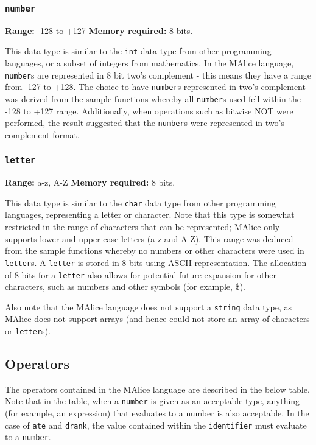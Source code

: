 \documentclass[a4wide, 10pt]{article}
\newcommand{\tab}{\hspace*{2em}}
\begin{document}
\subsubsection{\texttt{number}}
\label{sec:number}
{\bf Range:} -128 to +127 {\bf Memory required:} 8 bits.
 
\tab This data type is similar to the \texttt{int} data type from other 
programming languages, or a subset of integers from mathematics. In the MAlice 
language, \texttt{number}s are represented in 8 bit two's complement - this
means they have a range from -127 to +128. The choice to have \texttt{number}s
represented in two's complement was derived from the sample functions whereby
all \texttt{number}s used fell within the -128 to +127 range. Additionally, when
operations such as bitwise NOT were performed, the result suggested that the 
\texttt{number}s were represented in two's complement format.

\subsubsection{\texttt{letter}}

{\bf Range:} a-z, A-Z {\bf Memory required:} 8 bits.

\tab This data type is similar to the \texttt{char} data type from other
programming languages, representing a letter or character. Note that this type
is somewhat restricted in the range of characters that can be represented; 
MAlice only supports lower and upper-case letters (a-z and A-Z). This range was 
deduced from the sample functions whereby no numbers or other characters were 
used in \texttt{letter}s. A \texttt{letter} is stored in 8 bits using ASCII 
representation. The allocation of 8 bits for a \texttt{letter} also allows for
potential future expansion for other characters, such as numbers and other 
symbols (for example, \$).

Also note that the MAlice language does not support a \texttt{string} data 
type, as MAlice does not support arrays (and hence could not store an array of
characters or \texttt{letter}s).

\subsection{Operators}
The operators contained in the MAlice language are described in the below table.
Note that in the table, when a \texttt{number} is given as an acceptable type,
anything (for example, an expression) that evaluates to a number is also
acceptable. In the case of \texttt{ate} and \texttt{drank}, the value contained
within the \texttt{identifier} must evaluate to a \texttt{number}.
\end{document}

